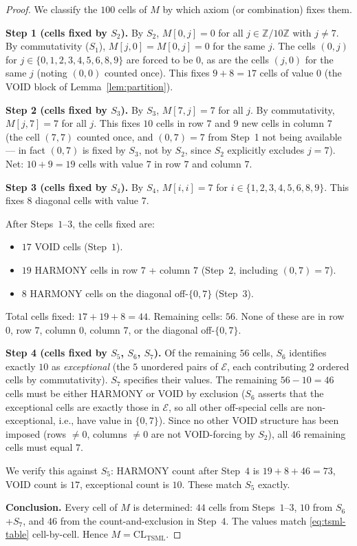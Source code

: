 \documentclass[11pt,reqno]{amsart}
\theoremstyle{plain}
\theoremstyle{definition}
\theoremstyle{remark}
\newcommand{\Z}{\mathbb{Z}}
\newcommand{\TSML}{\mathrm{TSML}}
\newcommand{\CL}{\mathrm{CL}}
\begin{document}
\begin{proof}
We classify the $100$ cells of $M$ by which axiom (or combination)
fixes them.

\smallskip
\noindent\textbf{Step 1 (cells fixed by $S_{2}$).}
By $S_{2}$, $M[0, j] = 0$ for all $j \in \Z/10\Z$ with $j \neq 7$.
By commutativity ($S_{1}$), $M[j, 0] = M[0, j] = 0$ for the same
$j$. The cells $(0, j)$ for $j \in \{0, 1, 2, 3, 4, 5, 6, 8, 9\}$
are forced to be $0$, as are the cells $(j, 0)$ for the same $j$
(noting $(0, 0)$ counted once). This fixes $9 + 8 = 17$ cells of
value $0$ (the VOID block of Lemma~\ref{lem:partition}).

\smallskip
\noindent\textbf{Step 2 (cells fixed by $S_{3}$).}
By $S_{3}$, $M[7, j] = 7$ for all $j$. By commutativity,
$M[j, 7] = 7$ for all $j$. This fixes $10$ cells in row $7$ and $9$
new cells in column $7$ (the cell $(7, 7)$ counted once, and
$(0, 7) = 7$ from Step~1 not being available --- in fact
$(0, 7)$ is fixed by $S_{3}$, not by $S_{2}$, since $S_{2}$
explicitly excludes $j = 7$). Net: $10 + 9 = 19$ cells with value $7$
in row $7$ and column $7$.

\smallskip
\noindent\textbf{Step 3 (cells fixed by $S_{4}$).}
By $S_{4}$, $M[i, i] = 7$ for $i \in \{1, 2, 3, 4, 5, 6, 8, 9\}$.
This fixes $8$ diagonal cells with value $7$.

\smallskip
After Steps~$1$--$3$, the cells fixed are:
\begin{itemize}
\item $17$ VOID cells (Step~$1$).
\item $19$ HARMONY cells in row $7$ + column $7$ (Step~$2$, including
$(0, 7) = 7$).
\item $8$ HARMONY cells on the diagonal off-$\{0, 7\}$ (Step~$3$).
\end{itemize}
Total cells fixed: $17 + 19 + 8 = 44$. Remaining cells: $56$. None of
these are in row $0$, row $7$, column $0$, column $7$, or the
diagonal off-$\{0, 7\}$.

\smallskip
\noindent\textbf{Step 4 (cells fixed by $S_{5}$, $S_{6}$, $S_{7}$).}
Of the remaining $56$ cells, $S_{6}$ identifies exactly $10$ as
\emph{exceptional} (the $5$ unordered pairs of $\mathcal{E}$, each
contributing $2$ ordered cells by commutativity). $S_{7}$ specifies
their values. The remaining $56 - 10 = 46$ cells must be either
HARMONY or VOID by exclusion ($S_{6}$ asserts that the exceptional
cells are exactly those in $\mathcal{E}$, so all other off-special
cells are non-exceptional, i.e., have value in $\{0, 7\}$). Since
no other VOID structure has been imposed (rows $\neq 0$, columns
$\neq 0$ are not VOID-forcing by $S_{2}$), all $46$ remaining cells
must equal $7$.

We verify this against $S_{5}$: HARMONY count after Step~$4$ is
$19 + 8 + 46 = 73$, VOID count is $17$, exceptional count is
$10$. These match $S_{5}$ exactly.

\smallskip
\noindent\textbf{Conclusion.}
Every cell of $M$ is determined: $44$ cells from Steps~$1$--$3$,
$10$ from $S_{6}$+$S_{7}$, and $46$ from the count-and-exclusion in
Step~$4$. The values match \eqref{eq:tsml-table} cell-by-cell.
Hence $M = \CL_{\TSML}$.
\end{proof}
\end{document}
